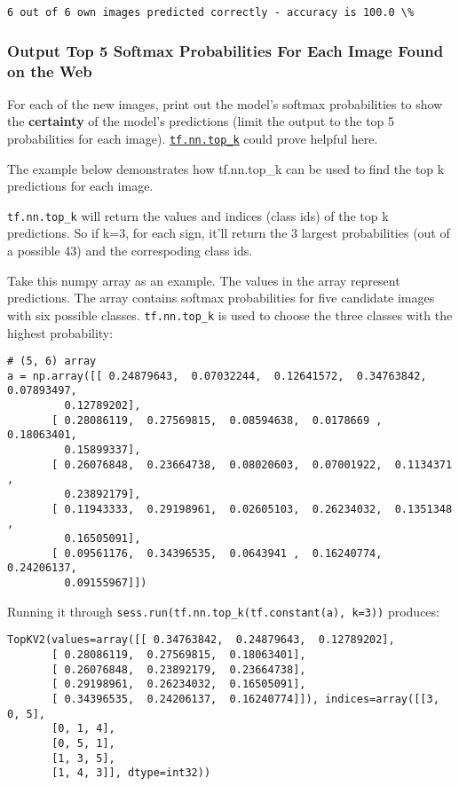 \documentclass[11pt]{article}
\begin{document}
    \begin{Verbatim}[commandchars=\\\{\}]
6 out of 6 own images predicted correctly - accuracy is 100.0 \%

    \end{Verbatim}

    \subsubsection{Output Top 5 Softmax Probabilities For Each Image Found
on the
Web}\label{output-top-5-softmax-probabilities-for-each-image-found-on-the-web}

    For each of the new images, print out the model's softmax probabilities
to show the \textbf{certainty} of the model's predictions (limit the
output to the top 5 probabilities for each image).
\href{https://www.tensorflow.org/versions/r0.12/api_docs/python/nn.html\#top_k}{\texttt{tf.nn.top\_k}}
could prove helpful here.

The example below demonstrates how tf.nn.top\_k can be used to find the
top k predictions for each image.

\texttt{tf.nn.top\_k} will return the values and indices (class ids) of
the top k predictions. So if k=3, for each sign, it'll return the 3
largest probabilities (out of a possible 43) and the correspoding class
ids.

Take this numpy array as an example. The values in the array represent
predictions. The array contains softmax probabilities for five candidate
images with six possible classes. \texttt{tf.nn.top\_k} is used to
choose the three classes with the highest probability:

\begin{verbatim}
# (5, 6) array
a = np.array([[ 0.24879643,  0.07032244,  0.12641572,  0.34763842,  0.07893497,
         0.12789202],
       [ 0.28086119,  0.27569815,  0.08594638,  0.0178669 ,  0.18063401,
         0.15899337],
       [ 0.26076848,  0.23664738,  0.08020603,  0.07001922,  0.1134371 ,
         0.23892179],
       [ 0.11943333,  0.29198961,  0.02605103,  0.26234032,  0.1351348 ,
         0.16505091],
       [ 0.09561176,  0.34396535,  0.0643941 ,  0.16240774,  0.24206137,
         0.09155967]])
\end{verbatim}

Running it through \texttt{sess.run(tf.nn.top\_k(tf.constant(a),\ k=3))}
produces:

\begin{verbatim}
TopKV2(values=array([[ 0.34763842,  0.24879643,  0.12789202],
       [ 0.28086119,  0.27569815,  0.18063401],
       [ 0.26076848,  0.23892179,  0.23664738],
       [ 0.29198961,  0.26234032,  0.16505091],
       [ 0.34396535,  0.24206137,  0.16240774]]), indices=array([[3, 0, 5],
       [0, 1, 4],
       [0, 5, 1],
       [1, 3, 5],
       [1, 4, 3]], dtype=int32))
\end{verbatim}
\end{document}
